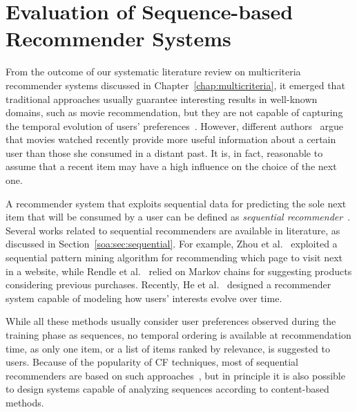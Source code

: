 \chapter{Evaluation of Sequence-based Recommender Systems}
\graphicspath{{Chapter04/Figures/}}
\label{chap:sequeval}

From the outcome of our systematic literature review on multicriteria recommender systems discussed in Chapter~\ref{chap:multicriteria}, it emerged that traditional approaches usually guarantee interesting results in well-known domains, such as movie recommendation, but they are not capable of capturing the temporal evolution of users' preferences~\cite{Campos2013}. However, different authors~\cite{Ding2005,Rendle2010,He2017} argue that movies watched recently provide more useful information about a certain user than those she consumed in a distant past. It is, in fact, reasonable to assume that a recent item may have a high influence on the choice of the next one.

A recommender system that exploits sequential data for predicting the sole next item that will be consumed by a user can be defined as \emph{sequential recommender}~\cite{Wang2015}. Several works related to sequential recommenders are available in literature, as discussed in Section~\ref{soa:sec:sequential}. For example, Zhou et al.~\cite{Zhou2004} exploited a sequential pattern mining algorithm for recommending which page to visit next in a website, while Rendle et al.~\cite{Rendle2010} relied on Markov chains for suggesting products considering previous purchases. Recently, He et al.~\cite{He2017} designed a recommender system capable of modeling how users' interests evolve over time.

While all these methods usually consider user preferences observed during the training phase as sequences, no temporal ordering is available at recommendation time, as only one item, or a list of items ranked by relevance, is suggested to users. Because of the popularity of CF techniques, most of sequential recommenders are based on such approaches~\cite{Quadrana2018}, but in principle it is also possible to design systems capable of analyzing sequences according to content-based methods.

